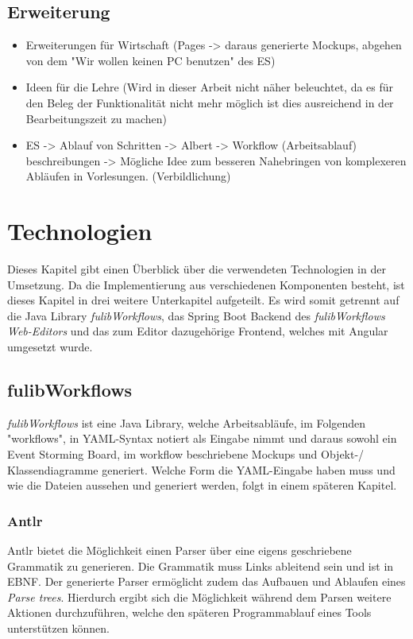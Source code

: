 \subsection{Erweiterung}\label{subsec:erweiterung}
\begin{itemize}
    \item Erweiterungen für Wirtschaft (Pages -> daraus generierte Mockups, abgehen von dem "Wir wollen keinen PC benutzen" des ES)
    \item Ideen für die Lehre (Wird in dieser Arbeit nicht näher beleuchtet, da es für den Beleg der Funktionalität nicht mehr möglich ist dies ausreichend in der Bearbeitungszeit zu machen)
    \item ES -> Ablauf von Schritten -> Albert -> Workflow (Arbeitsablauf) beschreibungen -> Mögliche Idee zum besseren Nahebringen von komplexeren Abläufen in Vorlesungen. (Verbildlichung)
\end{itemize}

\section{Technologien}\label{sec:technologien}
Dieses Kapitel gibt einen Überblick über die verwendeten Technologien in der Umsetzung.
Da die Implementierung aus verschiedenen Komponenten besteht, ist dieses Kapitel in drei weitere Unterkapitel aufgeteilt.
Es wird somit getrennt auf die Java Library \textit{fulibWorkflows}, das Spring Boot Backend des \textit{fulibWorkflows Web-Editors}
und das zum Editor dazugehörige Frontend, welches mit Angular umgesetzt wurde.

\subsection{fulibWorkflows}\label{subsec:fulibworkflows}
\textit{fulibWorkflows} ist eine Java Library, welche Arbeitsabläufe, im Folgenden "workflows", in \ac*{YAML}-Syntax notiert als Eingabe nimmt und daraus
sowohl ein Event Storming Board, im workflow beschriebene Mockups und Objekt-/ Klassendiagramme generiert.
Welche Form die YAML-Eingabe haben muss und wie die Dateien aussehen und generiert werden, folgt in einem späteren Kapitel.

\subsubsection{Antlr}\label{subsubsec:antlr}
Antlr bietet die Möglichkeit einen Parser über eine eigens geschriebene Grammatik zu generieren.
Die Grammatik muss Links ableitend sein und ist in EBNF.
Der generierte Parser ermöglicht zudem das Aufbauen und Ablaufen eines \textit{Parse trees}.
Hierdurch ergibt sich die Möglichkeit während dem Parsen weitere Aktionen durchzuführen, welche den späteren Programmablauf eines Tools unterstützen können.

